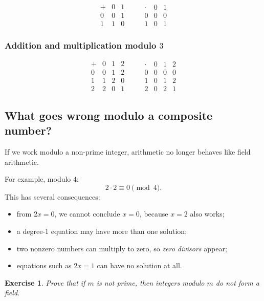 \documentclass[11pt]{article}
\newtheorem{exercise}[definition]{Exercise}
\begin{document}
\[
\begin{array}{c|cc}
+ & 0 & 1 \\\hline
0 & 0 & 1 \\
1 & 1 & 0
\end{array}
\qquad
\begin{array}{c|cc}
\cdot & 0 & 1 \\\hline
0 & 0 & 0 \\
1 & 0 & 1
\end{array}
\]

\subsubsection*{Addition and multiplication modulo \texorpdfstring{$3$}{3}}

\[
\begin{array}{c|ccc}
+ & 0 & 1 & 2 \\\hline
0 & 0 & 1 & 2 \\
1 & 1 & 2 & 0 \\
2 & 2 & 0 & 1
\end{array}
\qquad
\begin{array}{c|ccc}
\cdot & 0 & 1 & 2 \\\hline
0 & 0 & 0 & 0 \\
1 & 0 & 1 & 2 \\
2 & 0 & 2 & 1
\end{array}
\]

\subsection{What goes wrong modulo a composite number?}

If we work modulo a non-prime integer, arithmetic no longer behaves like field arithmetic.

For example, modulo \(4\):
\[
2\cdot 2\equiv 0\pmod 4.
\]
This has several consequences:
\begin{itemize}
  \item from \(2x=0\), we cannot conclude \(x=0\), because \(x=2\) also works;
  \item a degree-1 equation may have more than one solution;
  \item two nonzero numbers can multiply to zero, so \emph{zero divisors} appear;
  \item equations such as \(2x=1\) can have no solution at all.
\end{itemize}

\begin{exercise}
Prove that if \(m\) is not prime, then integers modulo \(m\) do not form a field.
\end{exercise}
\end{document}
